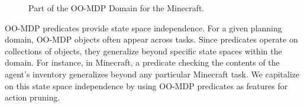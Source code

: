 \documentclass[letterpaper]{article}
\begin{document}
\begin{figure}
%
\caption{Part of the OO-MDP Domain for the Minecraft.}
\end{figure}

OO-MDP predicates provide state space independence. For a given
planning domain, OO-MDP objects often appear across tasks. Since
predicates operate on collections of objects, they generalize beyond
specific state spaces within the domain.  For instance, in Minecraft,
a predicate checking the contents of the agent's inventory generalizes
beyond any particular Minecraft task. We capitalize on this state
space independence by using OO-MDP predicates as features for action
pruning.
\end{document}
